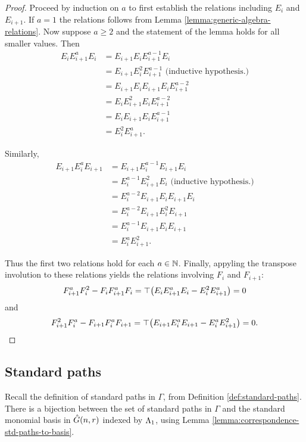 \documentclass[a4paper, 11pt]{report}
\begin{document}
\begin{proof}
Proceed by induction on $a$ to first establish the relations including $E_i$ and $E_{i+1}$. If $a=1$ the relations follows from Lemma \ref{lemma:generic-algebra-relations}. Now suppose $a\geq 2$ and the statement of the lemma holds for all smaller values. Then
\begin{align*}
E_iE_{i+1}^aE_i
&= E_{i+1}E_iE_{i+1}^{a-1}E_i\\
&= E_{i+1}E_i^2E_{i+1}^{a-1}\text{  (inductive hypothesis.)}\\
&= E_{i+1}E_iE_{i+1}E_iE_{i+1}^{a-2}\\
&= E_iE_{i+1}^2E_iE_{i+1}^{a-2}\\
&= E_iE_{i+1}E_iE_{i+1}^{a-1}\\
&= E_i^2E_{i+1}^a.
\end{align*}

Similarly,
\begin{align*}
E_{i+1}E_i^aE_{i+1}
&=E_{i+1}E_i^{a-1}E_{i+1}E_i\\
&=E_i^{a-1}E_{i+1}^2E_i\text{  (inductive hypothesis.)}\\
&=E_i^{a-2}E_{i+1}E_iE_{i+1}E_i\\
&=E_i^{a-2}E_{i+1}E_i^2E_{i+1}\\
&=E_i^{a-1}E_{i+1}E_iE_{i+1}\\
&=E_i^aE_{i+1}^2.
\end{align*}

Thus the first two relations hold for each $a\in\mathbb{N}$. Finally, appyling the transpose involution to these relations yields the relations involving $F_i$ and $F_{i+1}$:
\begin{equation*}
F_{i+1}^aF_i^2 -F_iF_{i+1}^aF_i = \top{\left(E_iE_{i+1}^aE_i -E_i^2E_{i+1}^a\right)} = 0
\end{equation*}
and
\begin{equation*}
F_{i+1}^2F_i^a -F_{i+1}F_i^aF_{i+1} = \top{\left(E_{i+1}E_i^aE_{i+1} -E_i^aE_{i+1}^2\right)} = 0.
\end{equation*}
\end{proof}


\subsection{Standard paths}

Recall the definition of standard paths in $\Gamma$, from Definition \ref{def:standard-paths}. There is a bijection between the set of standard paths in $\Gamma$ and the standard monomial basis in $\hat{G}(n,r)$ indexed by $\Lambda_1{}$, using Lemma \ref{lemma:correspondence-std-paths-to-basis}.
\end{document}
